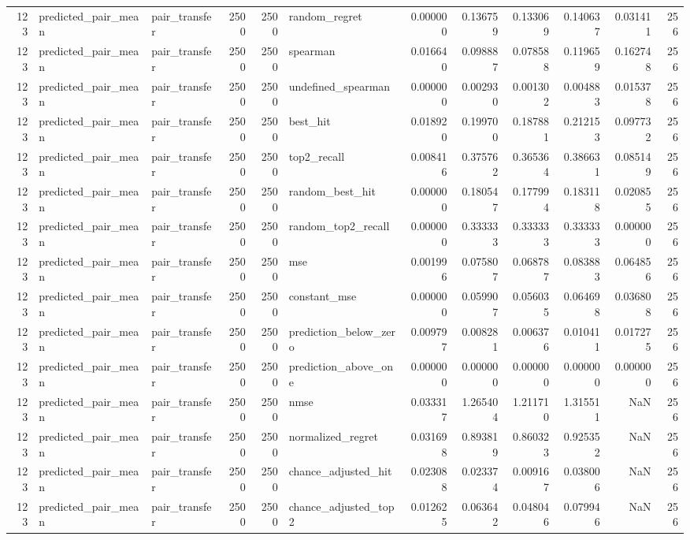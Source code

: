 \begin{tabular}{rllrrlrrrrrr}
123 & predicted_pair_mean & pair_transfer & 2500 & 2500 & random_regret & 0.000000 & 0.136759 & 0.133069 & 0.140637 & 0.031411 & 256 \\
123 & predicted_pair_mean & pair_transfer & 2500 & 2500 & spearman & 0.016640 & 0.098887 & 0.078588 & 0.119659 & 0.162748 & 256 \\
123 & predicted_pair_mean & pair_transfer & 2500 & 2500 & undefined_spearman & 0.000000 & 0.002930 & 0.001302 & 0.004883 & 0.015378 & 256 \\
123 & predicted_pair_mean & pair_transfer & 2500 & 2500 & best_hit & 0.018920 & 0.199700 & 0.187881 & 0.212153 & 0.097732 & 256 \\
123 & predicted_pair_mean & pair_transfer & 2500 & 2500 & top2_recall & 0.008416 & 0.375762 & 0.365364 & 0.386631 & 0.085149 & 256 \\
123 & predicted_pair_mean & pair_transfer & 2500 & 2500 & random_best_hit & 0.000000 & 0.180547 & 0.177994 & 0.183118 & 0.020855 & 256 \\
123 & predicted_pair_mean & pair_transfer & 2500 & 2500 & random_top2_recall & 0.000000 & 0.333333 & 0.333333 & 0.333333 & 0.000000 & 256 \\
123 & predicted_pair_mean & pair_transfer & 2500 & 2500 & mse & 0.001996 & 0.075807 & 0.068787 & 0.083883 & 0.064856 & 256 \\
123 & predicted_pair_mean & pair_transfer & 2500 & 2500 & constant_mse & 0.000000 & 0.059907 & 0.056035 & 0.064698 & 0.036808 & 256 \\
123 & predicted_pair_mean & pair_transfer & 2500 & 2500 & prediction_below_zero & 0.009797 & 0.008281 & 0.006376 & 0.010411 & 0.017275 & 256 \\
123 & predicted_pair_mean & pair_transfer & 2500 & 2500 & prediction_above_one & 0.000000 & 0.000000 & 0.000000 & 0.000000 & 0.000000 & 256 \\
123 & predicted_pair_mean & pair_transfer & 2500 & 2500 & nmse & 0.033317 & 1.265404 & 1.211710 & 1.315511 & NaN & 256 \\
123 & predicted_pair_mean & pair_transfer & 2500 & 2500 & normalized_regret & 0.031698 & 0.893819 & 0.860323 & 0.925352 & NaN & 256 \\
123 & predicted_pair_mean & pair_transfer & 2500 & 2500 & chance_adjusted_hit & 0.023088 & 0.023374 & 0.009167 & 0.038006 & NaN & 256 \\
123 & predicted_pair_mean & pair_transfer & 2500 & 2500 & chance_adjusted_top2 & 0.012625 & 0.063642 & 0.048046 & 0.079946 & NaN & 256 \\

\end{tabular}
